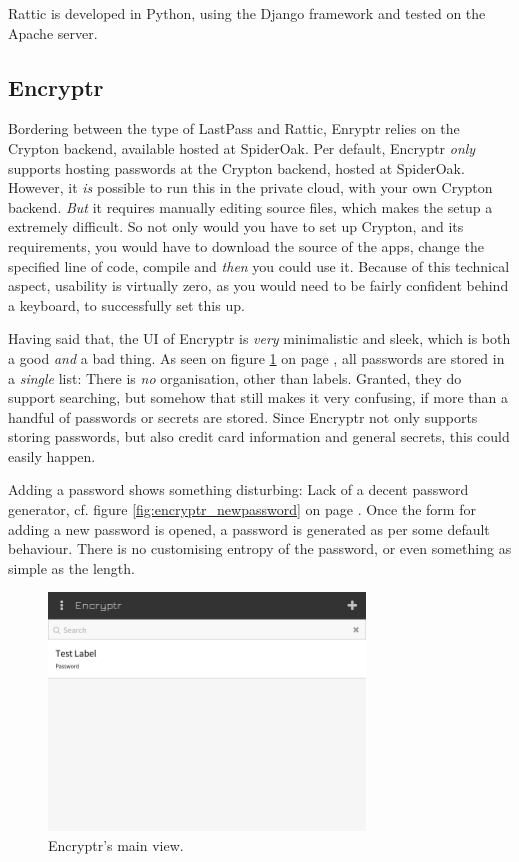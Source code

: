 			Rattic is developed in Python, using the Django framework and tested on the Apache server.

		\subsection*{Encryptr}
			Bordering between the type of LastPass and Rattic, Enryptr \cite{encryptr} relies on the Crypton\cite{crypton} backend\cite{encryptr_backend}, available hosted at SpiderOak\cite{crypton_spideroak}. Per default, Encryptr \emph{only} supports hosting passwords at the Crypton backend, hosted at SpiderOak. However, it \emph{is} possible to run this in the private cloud, with your own Crypton backend. \emph{But} it requires manually editing source files\cite{encryptr_selfhost}, which makes the setup a extremely difficult. So not only would you have to set up Crypton, and its requirements, you would have to download the source of the apps, change the specified line of code, compile and \emph{then} you could use it. Because of this technical aspect, usability is virtually zero, as you would need to be fairly confident behind a keyboard, to successfully set this up.

			Having said that, the UI of Encryptr is \emph{very} minimalistic and sleek, which is both a good \emph{and} a bad thing. As seen on figure \ref{fig:encryptr_main} on page \pageref{fig:encryptr_main}, all passwords are stored in a \emph{single} list: There is \emph{no} organisation, other than labels. Granted, they do support searching, but somehow that still makes it very confusing, if more than a handful of passwords or secrets are stored. Since Encryptr not only supports storing passwords, but also credit card information and general secrets, this could easily happen.

			Adding a password shows something disturbing: Lack of a decent password generator, cf. figure \ref{fig:encryptr_newpassword} on page \pageref{fig:encryptr_newpassword}. Once the form for adding a new password is opened, a password is generated as per some default behaviour. There is no customising entropy of the password, or even something as simple as the length.

			\begin{figure}[h!]
				\centering
				\includegraphics[width=0.75\textwidth]{figures/analysis/encryptr_main.png}
				\caption{Encryptr's main view.}
				\label{fig:encryptr_main}
			\end{figure}


